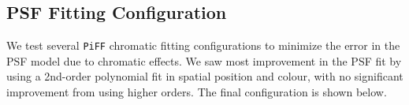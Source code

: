 \subsection{PSF Fitting Configuration}
We test several \texttt{PiFF} chromatic fitting configurations to minimize the error in the PSF model due to chromatic effects. 
We saw most improvement in the PSF fit by using a 2nd-order polynomial fit in spatial position and colour, with no significant improvement from using higher orders. 
The final configuration is shown below.
